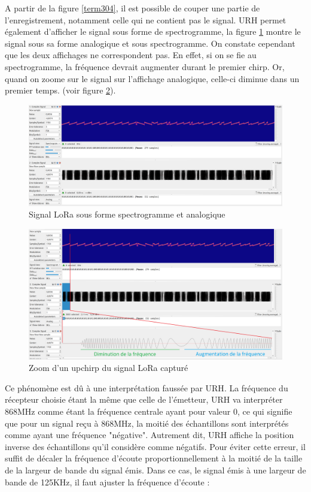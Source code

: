 A partir de la figure \ref{term304}, il est possible de couper une partie de l'enregistrement, notamment celle qui ne contient pas le signal. \ac{URH} permet également d'afficher le signal sous forme de spectrogramme, la figure \ref{term306} montre le signal sous sa forme analogique et sous spectrogramme. On constate cependant que les deux affichages ne correspondent pas. En effet, si on se fie au spectrogramme, la fréquence devrait augmenter durant le premier chirp. Or, quand on zoome sur le signal sur l'affichage analogique, celle-ci diminue dans un premier temps. (voir figure \ref{term307}).

\newpage

\begin{figure}[h]
\centering

\includegraphics[scale=0.11]{images/urh4.png}
\caption{Signal LoRa sous forme spectrogramme et analogique}\label{term306}
\end{figure}

\begin{figure}[h]
\centering

\includegraphics[scale=0.18]{images/urh5.png}
\caption{Zoom d'un upchirp du signal LoRa capturé}\label{term307}
\end{figure}

Ce phénomène est dû à une interprétation faussée par \ac{URH}. La fréquence du récepteur choisie étant la même que celle de l'émetteur, \ac{URH} va interpréter 868MHz comme étant la fréquence centrale ayant pour valeur 0, ce qui signifie que pour un signal reçu à 868MHz, la moitié des échantillons sont interprétés comme ayant une fréquence "négative". Autrement dit, \ac{URH} affiche la position inverse des échantillons qu'il considère comme négatifs. Pour éviter cette erreur, il suffit de décaler la fréquence d'écoute proportionnellement à la moitié de la taille de la largeur de bande du signal émis. Dans ce cas, le signal émis à une largeur de bande de 125KHz, il faut ajuster la fréquence d'écoute :

